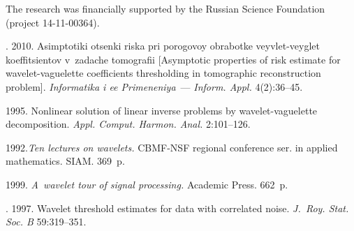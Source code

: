 


\vspace*{-3pt}

\Ack
\noindent
The research was financially supported by the Russian Science Foundation (project
14-11-00364).


  \begin{multicols}{2}

\renewcommand{\bibname}{\protect\rmfamily References}



{\small\frenchspacing
 { %
 \begin{thebibliography}{9}



. 2010.
Asimptotiki otsen\-ki riska pri porogovoy obrabotke veyvlet-veyglet
koeffitsientov v~zadache tomografii
[Asymptotic properties of risk estimate for wavelet-vaguelette coefficients
thresholding in  tomographic reconstruction problem].
\textit{Informatika i ee Primeneniya}~--- \textit{Inform. Appl.} 4(2):36--45.


 1995. Nonlinear solution of linear inverse problems
by wavelet-vaguelette decomposition.
\textit{Appl. Comput. Harmon. Anal.}  2:101--126.


 1992.\textit{Ten lectures on wavelets.}
CBMF-NSF regional
conference ser. in applied mathematics.
SIAM. 369~p.


  1999.
\textit{A~wavelet tour of signal processing.} Academic Press. 662~p.

. 1997.
Wavelet threshold estimates for data with correlated noise.
\textit{J.~Roy. Stat. Soc. B}  59:319--351.


\end{thebibliography}}}
\end{multicols}
